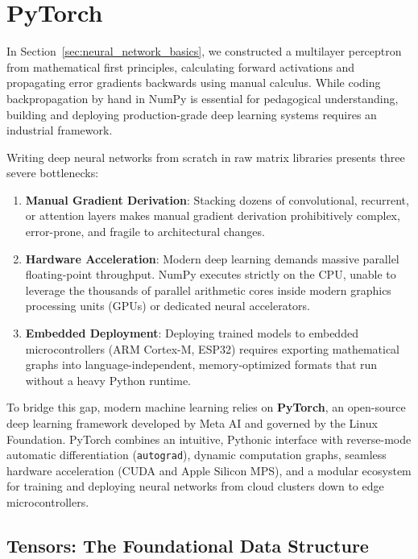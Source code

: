 \section{PyTorch}\label{sec:pytorch}

In Section~\ref{sec:neural_network_basics}, we constructed a multilayer perceptron from mathematical first principles, calculating forward activations and propagating error gradients backwards using manual calculus. While coding backpropagation by hand in NumPy is essential for pedagogical understanding, building and deploying production-grade deep learning systems requires an industrial framework.

Writing deep neural networks from scratch in raw matrix libraries presents three severe bottlenecks:
\begin{enumerate}
    \item \textbf{Manual Gradient Derivation}: Stacking dozens of convolutional, recurrent, or attention layers makes manual gradient derivation prohibitively complex, error-prone, and fragile to architectural changes.
    \item \textbf{Hardware Acceleration}: Modern deep learning demands massive parallel floating-point throughput. NumPy executes strictly on the CPU, unable to leverage the thousands of parallel arithmetic cores inside modern graphics processing units (GPUs) or dedicated neural accelerators.
    \item \textbf{Embedded Deployment}: Deploying trained models to embedded microcontrollers (ARM Cortex-M, ESP32) requires exporting mathematical graphs into language-independent, memory-optimized formats that run without a heavy Python runtime.
\end{enumerate}

To bridge this gap, modern machine learning relies on \textbf{PyTorch}, an open-source deep learning framework developed by Meta AI and governed by the Linux Foundation. PyTorch combines an intuitive, Pythonic interface with reverse-mode automatic differentiation (\texttt{autograd}), dynamic computation graphs, seamless hardware acceleration (CUDA and Apple Silicon MPS), and a modular ecosystem for training and deploying neural networks from cloud clusters down to edge microcontrollers.

\subsection{Tensors: The Foundational Data Structure}\label{subsec:tensors}

